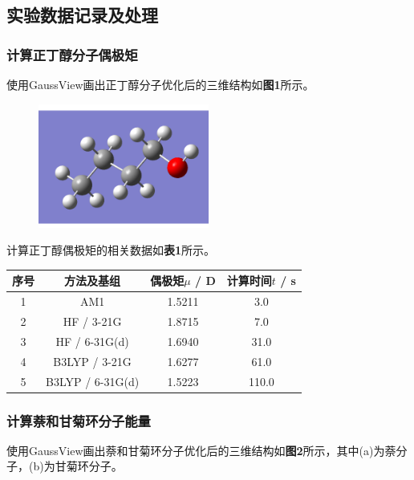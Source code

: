 \documentclass[12pt]{article}
\begin{document}
 		\subsection{实验数据记录及处理}
 		            \subsubsection{计算正丁醇分子偶极矩}
 		使用GaussView画出正丁醇分子优化后的三维结构如\textbf{图1}所示。\par
 		 \begin{figure}[h]
 			\centering
 			\includegraphics[width=0.5\textwidth]{1.png}
 		\end{figure}
 		计算正丁醇偶极矩的相关数据如\textbf{表1}所示。
 		  \begin{table}[h]
 			\centering
 			\begin{tabular}{cccc}
 				\toprule
 				序号 & 方法及基组 & 偶极矩$\mu$ / D & 计算时间$t$ / s \\
 				\midrule
 				1 & AM1 & 1.5211 & 3.0 \\
 				2 & HF / 3-21G & 1.8715 & 7.0 \\
 				3 & HF / 6-31G(d) & 1.6940 & 31.0 \\
 				4 & B3LYP / 3-21G & 1.6277 & 61.0 \\
 				5 & B3LYP / 6-31G(d) & 1.5223 & 110.0 \\
 				\bottomrule
 			\end{tabular}
 		\end{table}
 	
\vbox{}
 		 \subsubsection{计算萘和甘菊环分子能量}
 		 	使用GaussView画出萘和甘菊环分子优化后的三维结构如\textbf{图2}所示，其中(a)为萘分子，(b)为甘菊环分子。\par
 		 	
\end{document}
